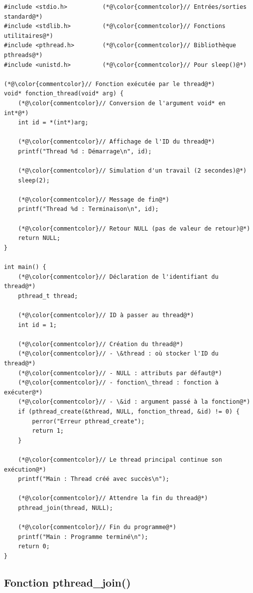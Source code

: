 \documentclass[11pt,a4paper]{article}
\begin{document}
\begin{lstlisting}[caption={Création basique d'un thread}]
#include <stdio.h>          (*@\color{commentcolor}// Entrées/sorties standard@*)
#include <stdlib.h>         (*@\color{commentcolor}// Fonctions utilitaires@*)
#include <pthread.h>        (*@\color{commentcolor}// Bibliothèque pthreads@*)
#include <unistd.h>         (*@\color{commentcolor}// Pour sleep()@*)

(*@\color{commentcolor}// Fonction exécutée par le thread@*)
void* fonction_thread(void* arg) {
    (*@\color{commentcolor}// Conversion de l'argument void* en int*@*)
    int id = *(int*)arg;
    
    (*@\color{commentcolor}// Affichage de l'ID du thread@*)
    printf("Thread %d : Démarrage\n", id);
    
    (*@\color{commentcolor}// Simulation d'un travail (2 secondes)@*)
    sleep(2);
    
    (*@\color{commentcolor}// Message de fin@*)
    printf("Thread %d : Terminaison\n", id);
    
    (*@\color{commentcolor}// Retour NULL (pas de valeur de retour)@*)
    return NULL;
}

int main() {
    (*@\color{commentcolor}// Déclaration de l'identifiant du thread@*)
    pthread_t thread;
    
    (*@\color{commentcolor}// ID à passer au thread@*)
    int id = 1;
    
    (*@\color{commentcolor}// Création du thread@*)
    (*@\color{commentcolor}// - \&thread : où stocker l'ID du thread@*)
    (*@\color{commentcolor}// - NULL : attributs par défaut@*)
    (*@\color{commentcolor}// - fonction\_thread : fonction à exécuter@*)
    (*@\color{commentcolor}// - \&id : argument passé à la fonction@*)
    if (pthread_create(&thread, NULL, fonction_thread, &id) != 0) {
        perror("Erreur pthread_create");
        return 1;
    }
    
    (*@\color{commentcolor}// Le thread principal continue son exécution@*)
    printf("Main : Thread créé avec succès\n");
    
    (*@\color{commentcolor}// Attendre la fin du thread@*)
    pthread_join(thread, NULL);
    
    (*@\color{commentcolor}// Fin du programme@*)
    printf("Main : Programme terminé\n");
    return 0;
}
\end{lstlisting}

\subsection{Fonction pthread\_join()}
\end{document}
